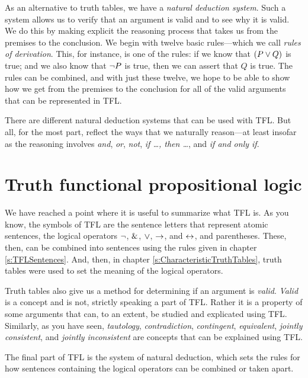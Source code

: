 As an alternative to truth tables, we have a \textit{natural deduction system}. Such a system allows us to verify that an argument is valid and to see why it is valid. We do this by making explicit the reasoning process that takes us from the premises to the conclusion. We begin with twelve basic rules---which we call \textit{rules of derivation}. This, for instance, is one of the rules: if we know that $(P \vee Q)$ is true; and we also know that ${\neg} P$ is true, then we can assert that $Q$ is true. The rules can be combined, and with just these twelve, we hope to be able to show how we get from the premises to the conclusion for all of the valid arguments that can be represented in TFL. 

There are different natural deduction systems that can be used with TFL. But all, for the most part, reflect the ways that we naturally reason---at least insofar as the reasoning involves \textit{and}, \textit{or}, \textit{not}, \textit{if \ldots, then \ldots}, and \textit{if and only if}. 


\section{Truth functional propositional logic}

We have reached a point where it is useful to summarize what TFL is. As you know, the symbols of TFL are the sentence letters that represent atomic sentences, the logical operators ${\neg}$, $\mathbin{\&}$, $\vee$, $\rightarrow$, and $\leftrightarrow$, and parentheses. These, then, can be combined into sentences using the rules given in chapter \ref{s:TFLSentences}. And, then, in chapter \ref{s:CharacteristicTruthTables}, truth tables were used to set the meaning of the logical operators. 

Truth tables also give us a method for determining if an argument is \textit{valid}. \textit{Valid} is a concept and is not, strictly speaking a part of TFL. Rather it is a property of some arguments that can, to an extent, be studied and explicated using TFL. Similarly, as you have seen, \textit{tautology}, \textit{contradiction}, \textit{contingent}, \textit{equivalent},  \textit{jointly consistent}, and \textit{jointly inconsistent} are concepts that can be explained using TFL.

The final part of TFL is the system of natural deduction, which sets the rules for how sentences containing the logical operators can be combined or taken apart. 

